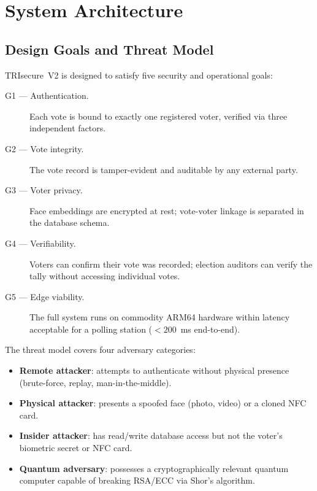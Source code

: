\documentclass[preprint,12pt]{elsarticle}
\begin{document}
\section{System Architecture}
\label{sec:architecture}

\subsection{Design Goals and Threat Model}

TRIsecure~V2 is designed to satisfy five security and operational goals:

\begin{description}
  \item[G1 — Authentication.] Each vote is bound to exactly one registered
    voter, verified via three independent factors.
  \item[G2 — Vote integrity.] The vote record is tamper-evident and
    auditable by any external party.
  \item[G3 — Voter privacy.] Face embeddings are encrypted at rest;
    vote-voter linkage is separated in the database schema.
  \item[G4 — Verifiability.] Voters can confirm their vote was recorded;
    election auditors can verify the tally without accessing individual votes.
  \item[G5 — Edge viability.] The full system runs on commodity ARM64
    hardware within latency acceptable for a polling station ($<200$~ms
    end-to-end).
\end{description}

The threat model covers four adversary categories:

\begin{itemize}
  \item \textbf{Remote attacker}: attempts to authenticate without physical
    presence (brute-force, replay, man-in-the-middle).
  \item \textbf{Physical attacker}: presents a spoofed face (photo, video)
    or a cloned NFC card.
  \item \textbf{Insider attacker}: has read/write database access but not
    the voter's biometric secret or NFC card.
  \item \textbf{Quantum adversary}: possesses a cryptographically relevant
    quantum computer capable of breaking RSA/ECC via Shor's algorithm.
\end{itemize}
\end{document}
